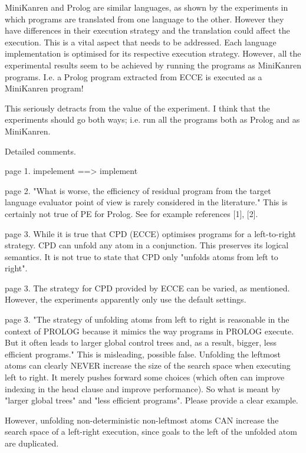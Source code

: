 MiniKanren and Prolog are similar languages, as shown by the experiments in which programs are translated from one language to the other.  However they have differences in their execution strategy and the translation could affect the execution.  This is a vital aspect that needs to be addressed.  Each language implementation is optimised for its respective execution strategy. However, all the experimental results seem to be achieved by running the programs as MiniKanren programs.  I.e. a Prolog program extracted from ECCE is executed as a MiniKanren program!


This seriously detracts from the value of the experiment. I think that the experiments should go both ways; i.e. run all the programs both as Prolog and as MiniKanren.



Detailed comments.

page 1. impelement ==> implement

page 2.  "What is worse, the efficiency of residual program from the target language evaluator point of view is rarely considered in the literature." This is certainly not true of PE for Prolog.  See for example references [1], [2].

page 3.  While it is true that CPD (ECCE) optimises programs for a left-to-right strategy. CPD can unfold any atom in a conjunction.  This preserves its logical semantics.  It is not true to state that CPD only "unfolds atoms from left to right".

page 3.  The strategy for CPD provided by ECCE can be varied, as mentioned.  However, the experiments apparently only use the default settings.

page 3. "The strategy of unfolding atoms from left to right is reasonable in the context of PROLOG because it mimics the way programs in PROLOG execute. But it often leads to larger global control trees and, as a result, bigger, less efficient programs."  This is misleading, possible false.  Unfolding the leftmost atoms can clearly NEVER increase the size of the search space when executing left to right.  It merely pushes forward some choices (which often can improve indexing in the head clause and improve performance). So what is meant by "larger global trees" and "less efficient programs". Please provide a clear example.

However, unfolding non-deterministic non-leftmost atoms CAN increase the search space of a left-right execution, since goals to the left of the unfolded atom are duplicated.


